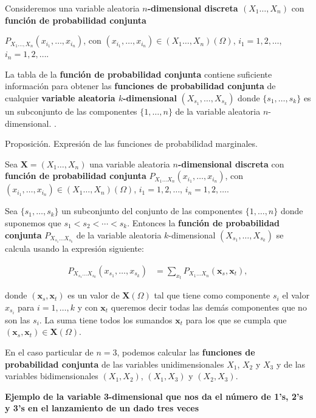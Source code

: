 \documentclass[
  letterpaper,
  DIV=11,
  numbers=noendperiod]{scrreprt}
\begin{document}
Consideremos una variable aleatoria \textbf{\(n\)-dimensional discreta
\((X_1\ldots,X_n)\)} con \textbf{función de probabilidad conjunta}

\(P_{X_1\ldots,X_n}(x_{i_1},\ldots,x_{i_n})\), con
\((x_{i_1},\ldots,x_{i_n})\in (X_1\ldots,X_n)(\Omega)\),
\(i_1=1,2,\ldots\), \(i_n=1,2,\ldots\).

La tabla de la \textbf{función de probabilidad conjunta} contiene
suficiente información para obtener las \textbf{funciones de
probabilidad conjunta} de cualquier \textbf{variable aleatoria
\(k\)-dimensional} \((X_{s_1},\ldots,X_{s_k})\) donde
\(\{s_1,\ldots,s_k\}\) es un subconjunto de las componentes
\(\{1,\ldots,n\}\) de la variable aleatoria \(n\)-dimensional. .

Proposición. Expresión de las funciones de probabilidad marginales.

Sea \(\mathbf{X}=(X_1\ldots,X_n)\) una variable aleatoria
\textbf{\(n\)-dimensional discreta} con \textbf{función de probabilidad
conjunta} \(P_{X_1\ldots X_n}(x_{i_1},\ldots,x_{i_n})\), con
\((x_{i_1},\ldots,x_{i_n})\in (X_1\ldots,X_n)(\Omega)\),
\(i_1=1,2,\ldots\), \(i_n=1,2,\ldots\).

Sea \(\{s_1,\ldots,s_k\}\) un subconjunto del conjunto de las
componentes \(\{1,\ldots,n\}\) donde suponemos que
\(s_1 < s_2<\cdots < s_k\). Entonces la \textbf{función de probabilidad
conjunta} \(P_{X_{s_1}\ldots X_{s_k}}\) de la variable aleatoria
\(k\)-dimensional \((X_{s_1},\ldots, X_{s_k})\) se calcula usando la
expresión siguiente:

\[
\begin{array}{rl}
P_{X_{s_1}\ldots X_{s_k}}(x_{s_1},\ldots,x_{s_k})  & = \sum_{x_t} P_{X_1\ldots X_n}(\mathbf{x}_s,\mathbf{x}_t),
\end{array}
\]

donde \((\mathbf{x}_s,\mathbf{x}_t)\) es un valor de
\(\mathbf{X}(\Omega)\) tal que tiene como componente \(s_i\) el valor
\(x_{s_i}\) para \(i=1,\ldots, k\) y con \(\mathbf{x}_t\) queremos decir
todas las demás componentes que no son las \(s_i\). La suma tiene todos
los sumandos \(\mathbf{x}_t\) para los que se cumpla que
\((\mathbf{x}_s,\mathbf{x}_t)\in \mathbf{X}(\Omega)\).

En el caso particular de \(n=3\), podemos calcular las \textbf{funciones
de probabilidad conjunta} de las variables unidimensionales \(X_1\),
\(X_2\) y \(X_3\) y de las variables bidimensionales \((X_1,X_2)\),
\((X_1,X_3)\) y \((X_2,X_3)\).

\textbf{Ejemplo de la variable 3-dimensional que nos da el número de
1's, 2's y 3's en el lanzamiento de un dado tres veces}
\end{document}
